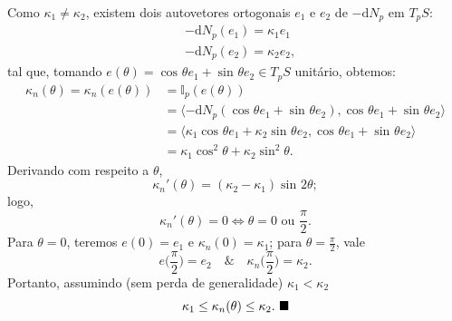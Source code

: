 \documentclass[../differential_geometry.tex]{subfiles}
\begin{document}
\begin{proof*}
	Como \(\kappa_1\neq \kappa_2\), existem dois autovetores ortogonais \(e_1\) e \(e_2\) de \(-\mathrm{d}N_{p}\) em \(T_{p}S\):
	\begin{align*}
		 & -\mathrm{d}N_{p}(e_1) = \kappa_1e_1  \\
		 & -\mathrm{d}N_{p}(e_2) = \kappa_2e_2,
	\end{align*}
	tal que, tomando \(e(\theta ) = \cos^{}{\theta }e_1 + \sin^{}{\theta }e_2\in T_{p}S\) unitário, obtemos:
	\begin{align*}
		\kappa_{n}(\theta ) = \kappa_{n}(e(\theta )) & =\mathbb{I}_{p}(e(\theta ))                                                                                             \\
		                                             & =\langle -\mathrm{d}N_{p}(\cos^{}{\theta }e_1 + \sin^{}{\theta }e_2), \cos^{}{\theta }e_1 + \sin^{}{\theta }e_2 \rangle \\
		                                             & = \langle \kappa_1\cos^{}{\theta }e_1 + \kappa_2\sin^{}{\theta }e_2, \cos^{}{\theta }e_1 + \sin^{}{\theta }e_2 \rangle  \\
		                                             & = \kappa_1\cos^{2}{\theta } + \kappa_2 \sin^{2}{\theta }.
	\end{align*}
	Derivando com respeito a \(\theta \),
	\[
		\kappa_{n}'(\theta ) = (\kappa_2-\kappa_1)\sin^{}{2\theta };
	\]
	logo,
	\[
		\kappa_{n}'(\theta )=0\Longleftrightarrow \theta =0 \text{ ou }\frac{\pi }{2}.
	\]
	Para \(\theta =0\), teremos \(e(0)=e_1\) e \(\kappa_{n}(0) = \kappa_1\); para \(\displaystyle \theta = \frac{\pi }{2}\), vale
	\[
		e\biggl(\frac{\pi }{2}\biggr) = e_2 \quad\&\quad \kappa_{n}\biggl(\frac{\pi }{2}\biggr)=\kappa_2.
	\]
	Portanto, assumindo (sem perda de generalidade) \(\kappa_1 < \kappa_2\)
	\[
		\kappa_1 \leq \kappa_{n}(\theta ) \leq \kappa_2. \text{ $\blacksquare$}
	\]
\end{proof*}
\end{document}
